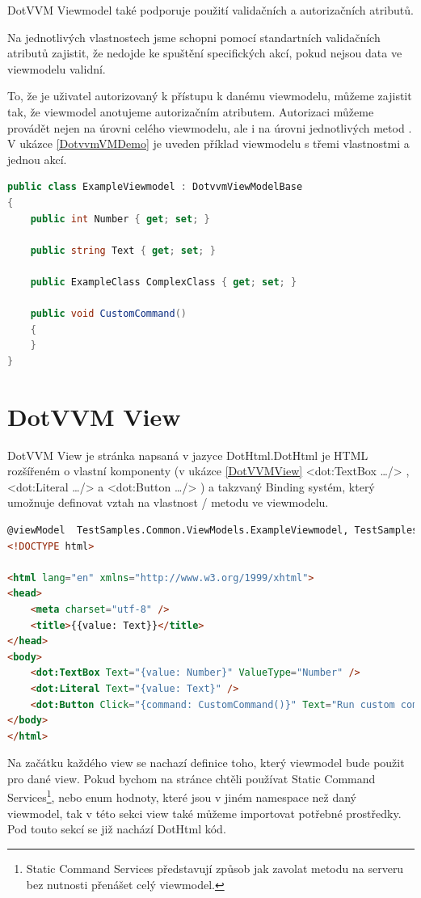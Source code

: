 DotVVM Viewmodel také podporuje použití validačních a autorizačních atributů.

Na jednotlivých vlastnostech jsme schopni pomocí standartních validačních atributů zajistit, že nedojde ke spuštění specifických akcí, pokud nejsou data ve viewmodelu validní\cite{DotVVM-Validation}. 

To, že je uživatel autorizovaný k přístupu k danému viewmodelu, můžeme zajistit tak, že viewmodel anotujeme autorizačním atributem. Autorizaci můžeme provádět nejen na úrovni celého viewmodelu, ale i na úrovni jednotlivých metod \cite{DotvvmAuth}. V ukázce \ref{DotvvmVMDemo} je uveden příklad viewmodelu s třemi vlastnostmi a jednou akcí.

\begin{lstlisting}[language=c#, caption=Ukázka DotVVM Viewmodelu,label=DotvvmVMDemo,captionpos=t]
public class ExampleViewmodel : DotvvmViewModelBase
{
    public int Number { get; set; }

    public string Text { get; set; }

    public ExampleClass ComplexClass { get; set; }

    public void CustomCommand() 
    {
    }
}
\end{lstlisting}


\section{DotVVM View}
DotVVM View je stránka napsaná v jazyce DotHtml.DotHtml je HTML rozšířeném o vlastní komponenty (v ukázce \ref{DotVVMView} <dot:TextBox \ldots /> , <dot:Literal \ldots /> a <dot:Button \ldots /> ) a takzvaný Binding systém, který umožnuje definovat vztah na vlastnost / metodu ve viewmodelu.

\begin{lstlisting}[language=html, caption=Ukázka DotHtml,captionpos=t,label=DotVVMView]
@viewModel  TestSamples.Common.ViewModels.ExampleViewmodel, TestSamples.Common
<!DOCTYPE html>

<html lang="en" xmlns="http://www.w3.org/1999/xhtml">
<head>
    <meta charset="utf-8" />
    <title>{{value: Text}}</title>
</head>
<body>
    <dot:TextBox Text="{value: Number}" ValueType="Number" />
    <dot:Literal Text="{value: Text}" />
    <dot:Button Click="{command: CustomCommand()}" Text="Run custom command" />
</body>
</html>
\end{lstlisting}

    Na začátku každého view se nachazí definice toho, který viewmodel bude použit pro dané view. Pokud bychom na stránce chtěli používat Static Command Services\footnote{Static Command Services představují způsob jak zavolat metodu na serveru bez nutnosti přenášet celý viewmodel.}, nebo enum hodnoty, které jsou v jiném namespace než daný viewmodel, tak v této sekci view také můžeme importovat potřebné prostředky. Pod touto sekcí se již nachází DotHtml kód.
    
